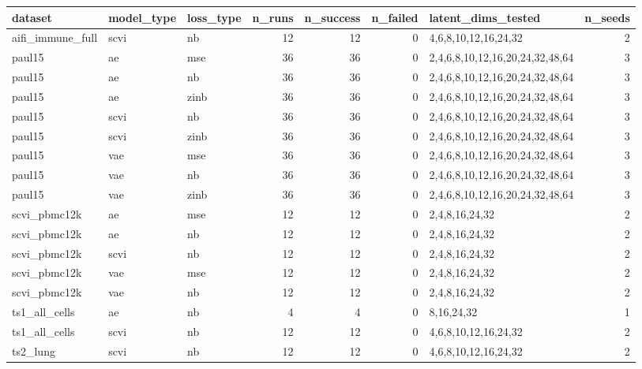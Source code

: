 \begin{tabular}{lllrrrlr}
\toprule
dataset & model\_type & loss\_type & n\_runs & n\_success & n\_failed & latent\_dims\_tested & n\_seeds \\
\midrule
aifi\_immune\_full & scvi & nb & 12 & 12 & 0 & 4,6,8,10,12,16,24,32 & 2 \\
paul15 & ae & mse & 36 & 36 & 0 & 2,4,6,8,10,12,16,20,24,32,48,64 & 3 \\
paul15 & ae & nb & 36 & 36 & 0 & 2,4,6,8,10,12,16,20,24,32,48,64 & 3 \\
paul15 & ae & zinb & 36 & 36 & 0 & 2,4,6,8,10,12,16,20,24,32,48,64 & 3 \\
paul15 & scvi & nb & 36 & 36 & 0 & 2,4,6,8,10,12,16,20,24,32,48,64 & 3 \\
paul15 & scvi & zinb & 36 & 36 & 0 & 2,4,6,8,10,12,16,20,24,32,48,64 & 3 \\
paul15 & vae & mse & 36 & 36 & 0 & 2,4,6,8,10,12,16,20,24,32,48,64 & 3 \\
paul15 & vae & nb & 36 & 36 & 0 & 2,4,6,8,10,12,16,20,24,32,48,64 & 3 \\
paul15 & vae & zinb & 36 & 36 & 0 & 2,4,6,8,10,12,16,20,24,32,48,64 & 3 \\
scvi\_pbmc12k & ae & mse & 12 & 12 & 0 & 2,4,8,16,24,32 & 2 \\
scvi\_pbmc12k & ae & nb & 12 & 12 & 0 & 2,4,8,16,24,32 & 2 \\
scvi\_pbmc12k & scvi & nb & 12 & 12 & 0 & 2,4,8,16,24,32 & 2 \\
scvi\_pbmc12k & vae & mse & 12 & 12 & 0 & 2,4,8,16,24,32 & 2 \\
scvi\_pbmc12k & vae & nb & 12 & 12 & 0 & 2,4,8,16,24,32 & 2 \\
ts1\_all\_cells & ae & nb & 4 & 4 & 0 & 8,16,24,32 & 1 \\
ts1\_all\_cells & scvi & nb & 12 & 12 & 0 & 4,6,8,10,12,16,24,32 & 2 \\
ts2\_lung & scvi & nb & 12 & 12 & 0 & 4,6,8,10,12,16,24,32 & 2 \\
\bottomrule
\end{tabular}
